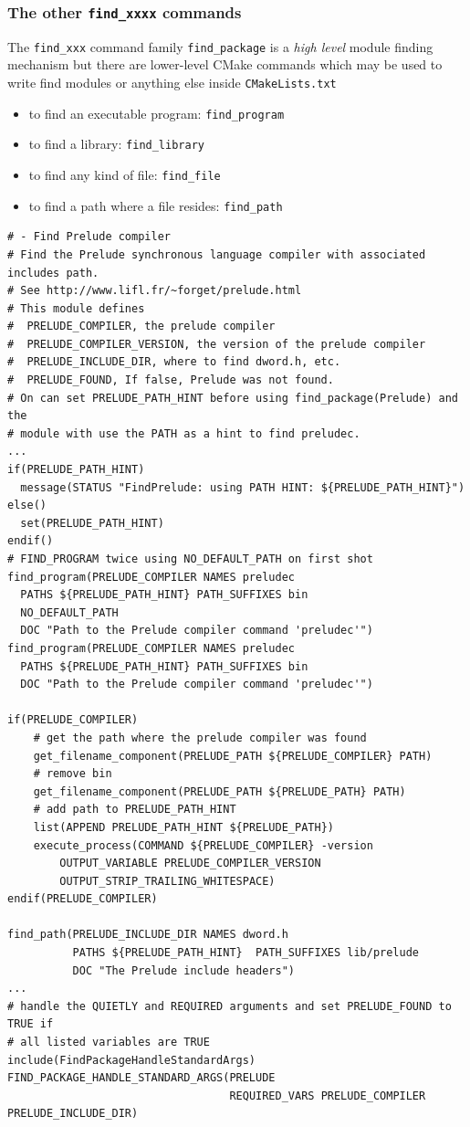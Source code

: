 \documentclass[compress,slidestop,table
              ]
               {beamer}
\newcommand{\fname}[1]{\texttt{#1}}
\begin{document}
\begin{frame}
\frametitle{The other \lstinline!find_xxxx! commands}
\begin{block}{The \lstinline!find_xxx! command family}
\lstinline!find_package! is a \emph{high level} module finding mechanism
but there are lower-level CMake commands which may be used to write
find modules or anything else inside \fname{CMakeLists.txt}
\end{block}
\begin{itemize}
\item to find an executable program: \lstinline!find_program!
\item to find a library: \lstinline!find_library!
\item to find any kind of file: \lstinline!find_file!
\item to find a path where a file resides: \lstinline!find_path!
\end{itemize}

\begin{lstlisting}[basicstyle=\tiny]
# - Find Prelude compiler
# Find the Prelude synchronous language compiler with associated includes path.
# See http://www.lifl.fr/~forget/prelude.html
# This module defines
#  PRELUDE_COMPILER, the prelude compiler
#  PRELUDE_COMPILER_VERSION, the version of the prelude compiler
#  PRELUDE_INCLUDE_DIR, where to find dword.h, etc.
#  PRELUDE_FOUND, If false, Prelude was not found.
# On can set PRELUDE_PATH_HINT before using find_package(Prelude) and the
# module with use the PATH as a hint to find preludec.
...
if(PRELUDE_PATH_HINT)
  message(STATUS "FindPrelude: using PATH HINT: ${PRELUDE_PATH_HINT}")
else()
  set(PRELUDE_PATH_HINT)
endif()
# FIND_PROGRAM twice using NO_DEFAULT_PATH on first shot
find_program(PRELUDE_COMPILER NAMES preludec
  PATHS ${PRELUDE_PATH_HINT} PATH_SUFFIXES bin
  NO_DEFAULT_PATH
  DOC "Path to the Prelude compiler command 'preludec'")
find_program(PRELUDE_COMPILER NAMES preludec
  PATHS ${PRELUDE_PATH_HINT} PATH_SUFFIXES bin
  DOC "Path to the Prelude compiler command 'preludec'")

if(PRELUDE_COMPILER)
    # get the path where the prelude compiler was found
    get_filename_component(PRELUDE_PATH ${PRELUDE_COMPILER} PATH)
    # remove bin
    get_filename_component(PRELUDE_PATH ${PRELUDE_PATH} PATH)
    # add path to PRELUDE_PATH_HINT
    list(APPEND PRELUDE_PATH_HINT ${PRELUDE_PATH})
    execute_process(COMMAND ${PRELUDE_COMPILER} -version
        OUTPUT_VARIABLE PRELUDE_COMPILER_VERSION
        OUTPUT_STRIP_TRAILING_WHITESPACE)
endif(PRELUDE_COMPILER)

find_path(PRELUDE_INCLUDE_DIR NAMES dword.h
          PATHS ${PRELUDE_PATH_HINT}  PATH_SUFFIXES lib/prelude
          DOC "The Prelude include headers")
...
# handle the QUIETLY and REQUIRED arguments and set PRELUDE_FOUND to TRUE if
# all listed variables are TRUE
include(FindPackageHandleStandardArgs)
FIND_PACKAGE_HANDLE_STANDARD_ARGS(PRELUDE
                                  REQUIRED_VARS PRELUDE_COMPILER PRELUDE_INCLUDE_DIR)
\end{lstlisting}
\end{frame}
\end{document}
